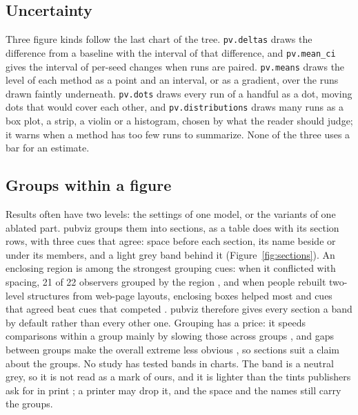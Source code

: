 \documentclass[11pt]{article}
\newcommand\code[1]{\texttt{#1}}
\begin{document}
\subsection{Uncertainty}

Three figure kinds follow the last chart of the tree. \code{pv.deltas} draws
the difference from a baseline with the interval of that difference, and
\code{pv.mean\_ci} gives the interval of per-seed changes when runs are
paired. \code{pv.means} draws the level of each method as a point and an
interval, or as a gradient, over the runs drawn faintly underneath.
\code{pv.dots} draws every run of a handful as a dot, moving dots that would
cover each other, and \code{pv.distributions} draws many runs as a box plot,
a strip, a violin or a histogram, chosen by what the reader should judge; it
warns when a method has too few runs to summarize. None of the three uses a
bar for an estimate.

\subsection{Groups within a figure}

Results often have two levels: the settings of one model, or the variants of
one ablated part. pubviz groups them into sections, as a table does with its
section rows, with three cues that agree: space before each section, its name
beside or under its members, and a light grey band behind it
(Figure~\ref{fig:sections}). An enclosing region is among the strongest
grouping cues: when it conflicted with spacing, 21 of 22 observers grouped by
the region \citep[p.~352]{montoro2015competicion}, and when people rebuilt
two-level structures from web-page layouts, enclosing boxes helped most and
cues that agreed beat cues that competed
\citep[Table~5, Sec.~4.4]{bae2014reinforcing}. pubviz therefore gives every
section a band by default rather than every other one. Grouping has a price:
it speeds comparisons within a group mainly by slowing those across groups
\citep[Exp.~3]{nothelfer2017redundant}, and gaps between groups make the
overall extreme less obvious \citep[Sec.~5.5]{fygenson2024arrangement}, so
sections suit a claim about the groups. No study has tested bands in charts.
The band is a neutral grey, so it is not read as a mark of ours, and it is
lighter than the tints publishers ask for in print \citep{ams2017graphics}; a
printer may drop it, and the space and the names still carry the groups.
\end{document}
